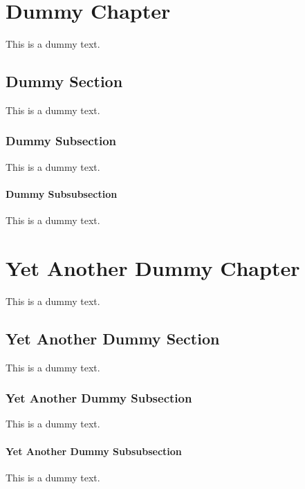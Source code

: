 \documentclass{standardtext}
\begin{document}
    \chapter{Dummy Chapter}
        This is a dummy text.
        \section{Dummy Section}
            This is a dummy text.
            \subsection{Dummy Subsection}
                This is a dummy text.
                \subsubsection{Dummy Subsubsection}
                    This is a dummy text.
    
    \chapter{Yet Another Dummy Chapter}
        This is a dummy text.
        \section{Yet Another Dummy Section}
            This is a dummy text.
            \subsection{Yet Another Dummy Subsection}
                This is a dummy text.
                \subsubsection{Yet Another Dummy Subsubsection}
                    This is a dummy text.
                
\end{document}
